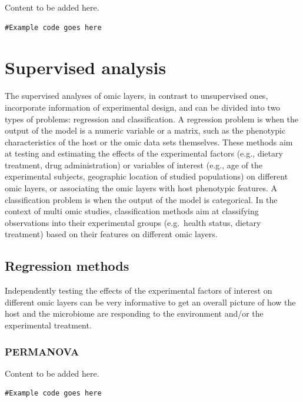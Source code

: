 \documentclass[
]{book}
\begin{document}
Content to be added here.

\begin{verbatim}
#Example code goes here
\end{verbatim}

\hypertarget{supervised-analysis}{%
\chapter{Supervised analysis}\label{supervised-analysis}}

The supervised analyses of omic layers, in contrast to unsupervised ones, incorporate information of experimental design, and can be divided into two types of problems: regression and classification. A regression problem is when the output of the model is a numeric variable or a matrix, such as the phenotypic characteristics of the host or the omic data sets themselves. These methods aim at testing and estimating the effects of the experimental factors (e.g., dietary treatment, drug administration) or variables of interest (e.g., age of the experimental subjects, geographic location of studied populations) on different omic layers, or associating the omic layers with host phenotypic features. A classification problem is when the output of the model is categorical. In the context of multi omic studies, classification methods aim at classifying observations into their experimental groups (e.g.~health status, dietary treatment) based on their features on different omic layers.

\hypertarget{regression-methods}{%
\section{Regression methods}\label{regression-methods}}

Independently testing the effects of the experimental factors of interest on different omic layers can be very informative to get an overall picture of how the host and the microbiome are responding to the environment and/or the experimental treatment.

\hypertarget{permanova}{%
\subsection{PERMANOVA}\label{permanova}}

Content to be added here.

\begin{verbatim}
#Example code goes here
\end{verbatim}
\end{document}
